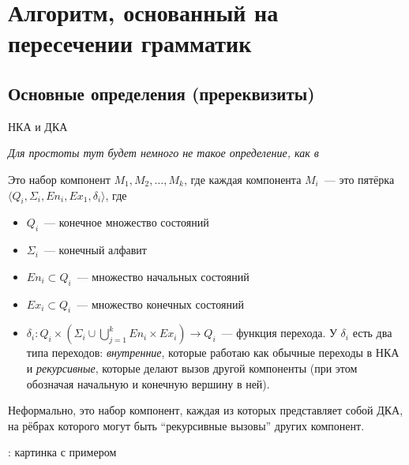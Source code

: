 \section{Алгоритм, основанный на пересечении грамматик}

\subsection{Основные определения (пререквизиты)}

\begin{definition}
    НКА и ДКА
    
\end{definition}

\begin{definition}
    \textit{Для простоты тут будет немного не такое определение, как в~\cite{Alur05}}

    Это набор компонент $M_1, M_2, \dots , M_k$, где каждая компонента $M_i$~--- это пятёрка $\langle Q_i, \Sigma_i, En_i, Ex_1, \delta_i \rangle$, где 
        \begin{itemize}
            \item $Q_i$~--- конечное множество состояний
            \item $\Sigma_i$~--- конечный алфавит
            \item $En_i \subset Q_i$~--- множество начальных состояний
            \item $Ex_i \subset Q_i$~--- множество конечных состояний
            \item $\delta_i \colon Q_i \times (\Sigma_i \cup \bigcup\limits_{j = 1}^k En_i \times Ex_i ) \to Q_i$~--- функция перехода. У $\delta_i$ есть два типа переходов: \textit{внутренние}, которые работаю как обычные переходы в НКА и \textit{рекурсивные}, которые делают вызов другой компоненты (при этом обозначая начальную и конечную вершину в ней).
        \end{itemize}

    Неформально, это набор компонент, каждая из которых представляет собой ДКА, на рёбрах которого могут быть ``рекурсивные вызовы'' других компонент.

    \TODO: картинка с примером
    
\end{definition}

\begin{definition}
\end{definition}

